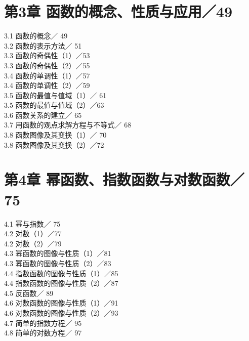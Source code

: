 \documentclass[10pt]{article}
\begin{document}
\section*{第3章 函数的概念、性质与应用／49}
3.1 函数的概念／ 49\\
3.2 函数的表示方法／ 51\\
3.3 函数的奇偶性（1）／53\\
3.3 函数的奇偶性（2）／55\\
3.4 函数的单调性（1）／57\\
3.4 函数的单调性（2）／59\\
3.5 函数的最值与值域（1）／ 61\\
3.5 函数的最值与值域（2）／63\\
3.6 函数关系的建立／ 65\\
3.7 用函数的观点求解方程与不等式／ 68\\
3.8 函数图像及其变换（1）／ 70\\
3.8 函数图像及其变换（2）／72

\section*{第4章 幂函数、指数函数与对数函数／75}
4.1 幂与指数／ 75\\
4.2 对数（1）／77\\
4.2 对数（2）／79\\
4.3 幂函数的图像与性质（1）／81\\
4.3 幂函数的图像与性质（2）／83\\
4.4 指数函数的图像与性质（1）／85\\
4.4 指数函数的图像与性质（2）／87\\
4.5 反函数／ 89\\
4.6 对数函数的图像与性质（1）／91\\
4.6 对数函数的图像与性质（2）／93\\
4.7 简单的指数方程／ 95\\
4.8 简单的对数方程／ 97
\end{document}
